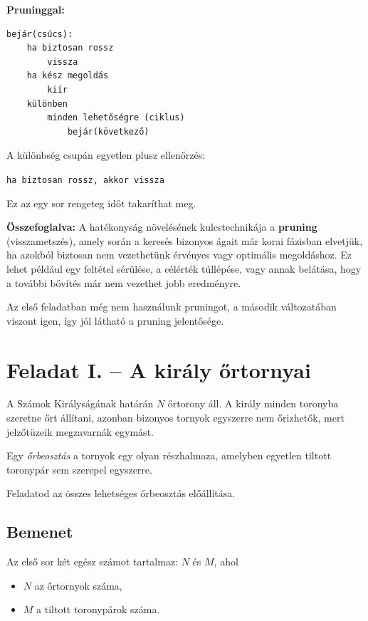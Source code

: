 \documentclass[12pt,a4paper]{article}
\begin{document}
\textbf{Pruninggal:}

\begin{verbatim}
bejár(csúcs):
    ha biztosan rossz
        vissza
    ha kész megoldás
        kiír
    különben
        minden lehetőségre (ciklus)
            bejár(következő)
\end{verbatim}

A különbség csupán egyetlen plusz ellenőrzés:

\texttt{ha biztosan rossz, akkor vissza}

Ez az egy sor rengeteg időt takaríthat meg.

\textbf{Összefoglalva:}
A hatékonyság növelésének kulcstechnikája a \textbf{pruning} (visszametszés), amely során a keresés bizonyos ágait már korai fázisban elvetjük, ha azokból biztosan nem vezethetünk érvényes vagy optimális megoldáshoz. Ez lehet például egy feltétel sérülése, a célérték túllépése, vagy annak belátása, hogy a további bővítés már nem vezethet jobb eredményre.



Az első feladatban még nem használunk pruningot, a második változatában viszont igen, így jól látható a pruning jelentősége.


\section{Feladat I. -- A király őrtornyai}

A Számok Királyságának határán $N$ őrtorony áll. A király minden toronyba szeretne őrt állítani, azonban bizonyos tornyok egyszerre nem őrizhetők, mert jelzőtüzeik megzavarnák egymást.

Egy \emph{őrbeosztás} a tornyok egy olyan részhalmaza, amelyben egyetlen tiltott toronypár sem szerepel egyszerre.

Feladatod az összes lehetséges őrbeosztás előállítása.

\subsection*{Bemenet}

Az első sor két egész számot tartalmaz: $N$ és $M$,
ahol

\begin{itemize}
    \item $N$ az őrtornyok száma,
    \item $M$ a tiltott toronypárok száma.
\end{itemize}
\end{document}
